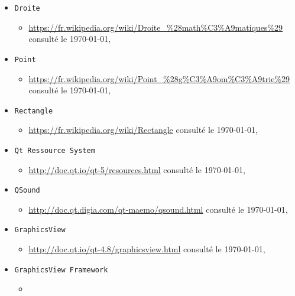 \documentclass[a4paper,11pt]{report}
\begin{document}
\begin{itemize}
		\begin{itemize}
			\item \url{https://fr.wikipedia.org/wiki/Ellipse_\%28math\%C3\%A9matiques\%29} consulté le \today,\\
		\end{itemize}
	\item[] \texttt{Droite}
		\begin{itemize}
			\item \url{https://fr.wikipedia.org/wiki/Droite_\%28math\%C3\%A9matiques\%29} consulté le \today,\\
		\end{itemize}
	\item[] \texttt{Point}
		\begin{itemize}
			\item \url{https://fr.wikipedia.org/wiki/Point_\%28g\%C3\%A9om\%C3\%A9trie\%29}
				consulté le \today,\\
		\end{itemize}
	\item[] \texttt{Rectangle}
		\begin{itemize}
			\item \url{https://fr.wikipedia.org/wiki/Rectangle} consulté le
				\today, \\
		\end{itemize}
	\item[]  \texttt{Qt Ressource System}
		\begin{itemize}
			\item \url{http://doc.qt.io/qt-5/resources.html} consulté le
				\today,\\
		\end{itemize}
	\item[] \texttt{QSound}
		\begin{itemize}
			\item \url{http://doc.qt.digia.com/qt-maemo/qsound.html} consulté le
				\today,\\
		\end{itemize}
	\item[] \texttt{GraphicsView}
		\begin{itemize}
			\item \url{http://doc.qt.io/qt-4.8/graphicsview.html} consulté le
				\today, \\
		\end{itemize}
	\item[] \texttt{GraphicsView Framework}
		\begin{itemize}
			\item

\end{itemize}
\end{itemize}
\end{document}
